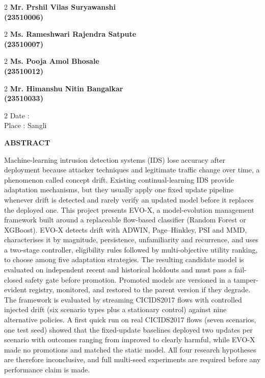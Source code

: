 \documentclass{article}
\begin{document}
		\begin{multicols}{2}
			\textbf{Mr. Prshil Vilas Suryawanshi\\ (23510006)}
			\end{multicols}
			\begin{multicols}{2}
		    \textbf{Ms. Rameshwari Rajendra Satpute\\ (23510007)}
			\end{multicols}
			\begin{multicols}{2}
		    \textbf{Ms. Pooja Amol Bhosale\\ (23510012)}
			\end{multicols}
			\begin{multicols}{2}
		    \textbf{Mr. Himanshu Nitin Bangalkar\\ (23510033)}
			 \end{multicols}

		\begin{multicols}{2}
		\noindent
		  Date : \\
		  Place : Sangli
		\end{multicols}

	\pagebreak
	\begin{center}
	\Large\textbf{ABSTRACT}
	\end{center}
	{\onehalfspacing\setlength{\parindent}{2em}
Machine-learning intrusion detection systems (IDS) lose accuracy after deployment because attacker techniques and legitimate traffic change over time, a phenomenon called concept drift. Existing continual-learning IDS provide adaptation mechanisms, but they usually apply one fixed update pipeline whenever drift is detected and rarely verify an updated model before it replaces the deployed one. This project presents EVO-X, a model-evolution management framework built around a replaceable flow-based classifier (Random Forest or XGBoost). EVO-X detects drift with ADWIN, Page--Hinkley, PSI and MMD, characterises it by magnitude, persistence, unfamiliarity and recurrence, and uses a two-stage controller, eligibility rules followed by multi-objective utility ranking, to choose among five adaptation strategies. The resulting candidate model is evaluated on independent recent and historical holdouts and must pass a fail-closed safety gate before promotion. Promoted models are versioned in a tamper-evident registry, monitored, and restored to the parent version if they degrade. The framework is evaluated by streaming CICIDS2017 flows with controlled injected drift (six scenario types plus a stationary control) against nine alternative policies. A first quick run on real CICIDS2017 flows (seven scenarios, one test seed) showed that the fixed-update baselines deployed two updates per scenario with outcomes ranging from improved to clearly harmful, while EVO-X made no promotions and matched the static model. All four research hypotheses are therefore inconclusive, and full multi-seed experiments are required before any performance claim is made.
	\par}
\end{document}
